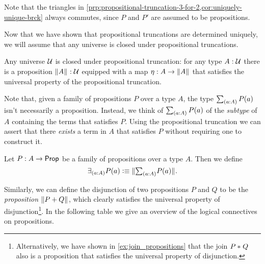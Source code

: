 \begin{rmk}
  Note that the triangles in \cref{prp:propositional-truncation-3-for-2,cor:uniquely-unique-brck} always commutes, since $P$ and $P'$ are assumed to be propositions.
\end{rmk}

Now that we have shown that propositional truncations are determined uniquely, we will assume that any universe is closed under propositional truncations.

\begin{axiom}
  Any universe $\mathcal{U}$ is closed under propositional truncation: for any type $A:\mathcal{U}$ there is a proposition $\Vert A\Vert_{}:\mathcal{U}$ equipped with a map $\eta:A\to\Vert A\Vert_{}$ that satisfies the universal property of the propositional truncation.
\end{axiom}

Note that, given a family of propositions $P$ over a type $A$, the type $\sm{a:A}P(a)$ isn't necessarily a proposition. Instead, we think of $\sm{a:A}P(a)$ of the \emph{subtype} of $A$ containing the terms that satisfies $P$. Using the propositional truncation we can assert that there \emph{exists} a term in $A$ that satisfies $P$ without requiring one to construct it. 

\begin{defn}
Let $P:A\to \mathsf{Prop}$ be a family of propositions over a type $A$. Then we define
\begin{equation*}
\exists_{(a:A)}P(a)\defeq \brck{\sm{a:A}P(a)}.
\end{equation*}
\end{defn}

Similarly, we can define the disjunction of two propositions $P$ and $Q$ to be the \emph{proposition} $\Vert P+Q\Vert_{}$, which clearly satisfies the universal property of disjunction\footnote{Alternatively, we have shown in \cref{ex:join_propositions} that the join ${P}\ast_{}{Q}$ also is a proposition that satisfies the universal property of disjunction.}. In the following table we give an overview of the logical connectives on propositions.

